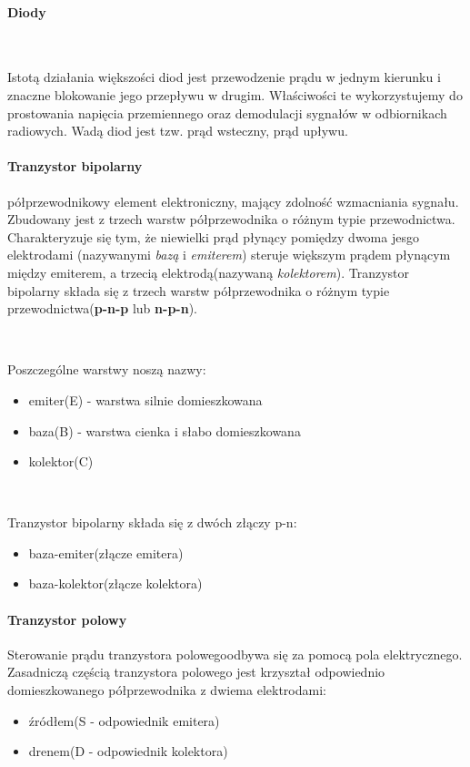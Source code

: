 \documentclass{article}
\begin{document}
            \paragraph{Diody}

            \
            
            Istotą działania większości diod jest przewodzenie prądu
            w jednym kierunku i znaczne blokowanie jego przepływu
            w drugim. Właściwości te wykorzystujemy do prostowania
            napięcia przemiennego oraz demodulacji sygnałów w
            odbiornikach radiowych. Wadą diod jest tzw. prąd wsteczny,
            prąd upływu.

            \paragraph{Tranzystor bipolarny}
            półprzewodnikowy element elektroniczny, mający zdolność wzmacniania sygnału.
            Zbudowany jest z trzech warstw półprzewodnika o różnym typie przewodnictwa.
            Charakteryzuje się tym, że niewielki prąd płynący pomiędzy dwoma jesgo elektrodami
            (nazywanymi \textit{bazą} i \textit{emiterem}) steruje większym prądem
            płynącym między emiterem, a trzecią elektrodą(nazywaną \textit{kolektorem}).
            Tranzystor bipolarny składa się z trzech warstw półprzewodnika
            o różnym typie przewodnictwa(\textbf{p-n-p} lub \textbf{n-p-n}).

            \
            
            Poszczególne warstwy noszą nazwy:
            \begin{itemize}
                \item emiter(E) - warstwa silnie domieszkowana
                \item baza(B) - warstwa cienka i słabo domieszkowana
                \item kolektor(C)
            \end{itemize}

            \

            Tranzystor bipolarny składa się z dwóch złączy p-n:
            \begin{itemize}
                \item baza-emiter(złącze emitera)
                \item baza-kolektor(złącze kolektora)
            \end{itemize}

            \paragraph{Tranzystor polowy}
            Sterowanie prądu tranzystora polowegoodbywa się za pomocą pola
            elektrycznego. Zasadniczą częścią tranzystora polowego jest krzyształ
            odpowiednio domieszkowanego półprzewodnika z dwiema elektrodami:
            \begin{itemize}
                \item źródłem(S - odpowiednik emitera)
                \item drenem(D - odpowiednik kolektora)
            \end{itemize}
\end{document}
